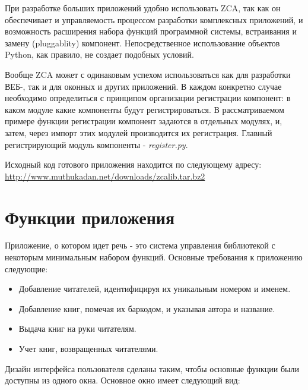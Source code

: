 \documentclass[a4paper,openany,twoside,final]{book}
\providecommand*{\DUroletitlereference}[1]{\textsl{#1}}
\begin{document}
При разработке больших приложений удобно использовать ZCA, так как он
обеспечивает и управляемость процессом разработки комплексных
приложений, и возможность расширения набора функций программной
системы, встраивания и замену (pluggablity) компонент.
Непосредственное использование объектов Python, как правило, не
создает подобных условий.

Вообще ZCA может с одинаковым успехом использоваться как для
разработки ВЕБ-, так и для оконных и других приложений.  В каждом
конкретно случае необходимо определиться с принципом организации
регистрации компонент: в каком модуле какие компоненты будут
регистрироваться.  В рассматриваемом примере функции регистрации
компонент задаются в отдельных модулях, и, затем, через импорт этих
модулей производится их регистрация.  Главный регистрирующий модуль
компоненты - \DUroletitlereference{register.py}.

Исходный код готового приложения находится по следующему адресу:
\url{http://www.muthukadan.net/downloads/zcalib.tar.bz2}


\section{Функции приложения%
  \label{id51}%
}

Приложение, о котором идет речь - это система управления библиотекой с
некоторым минимальным набором функций.  Основные требования к
приложению следующие:

\begin{itemize}

\item Добавление читателей, идентифицируя их уникальным номером и именем.

\item Добавление книг, помечая их баркодом, и указывая автора и название.

\item Выдача книг на руки читателям.

\item Учет книг, возвращенных читателями.

\end{itemize}

Дизайн интерфейса пользователя сделаны таким, чтобы основные функции
были доступны из одного окна.  Основное окно имеет следующий вид:

\noindent{}
\end{document}
